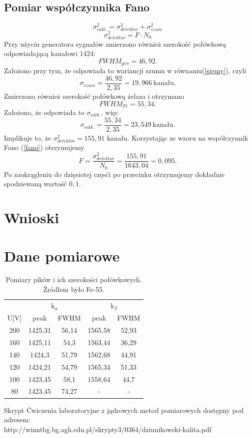 \documentclass[11pt,a4paper]{article}
\begin{document}
\subsection{Pomiar współczynnika Fano}
\begin{equation}
	\sigma_{całk.}^2 = \sigma_{detektor}^2 + \sigma_{szum}^2
	\label{sigmy}
\end{equation}
\begin{equation}
	\sigma_{detektor}^2 = F\cdot N_0
	\label{fano}
\end{equation}
Przy użyciu generatora sygnałów zmierzono również szerokość połówkową odpowiadającą kanałowi 1424:
$$FWHM_{gen} = 46,92.$$
Założono przy tym, że odpowiada to wariancji szumu w równaniu(\ref{sigmy}), czyli
$$\sigma_{szum} = \frac{46,92}{2,35} = 19,966~ \text{kanału}. $$
Zmierzono również szerokość połówkową żelaza i otrzymano
$$FWHM_{Fe} = 55,34.$$
Założono, że odpowiada to $\sigma_{całk.}$, więc
$$\sigma_{całk.} = \frac{55,34}{2,35} = 23,549~ \text{kanału}.$$
Implikuje to, że $\sigma_{detektor}^2 = 155,91$ kanału.
Korzystając ze wzoru na współczynnik Fano (\ref{fano}) otrzymujemy
$$ F = \frac{\sigma_{detektor}^2}{N_0} = \frac{155,91}{1643,04} = 0,095.$$
Po zaokrągleniu do dzięsiotej częsći po przecinku otrzymujemy dokładnie spodziewaną wartość $0,1$.
\section{Wnioski}

\section{Dane pomiarowe}

\begin{longtable}{c|cc|cc}
	\caption{Pomiary pików i ich szerokości połówkowych. Źródłem było Fe-55.}\\
\label{dt2}
 &\multicolumn{2}{c|}{k$_{\alpha}$}	&\multicolumn{2}{c}{k$_{\beta}$} \\
U[V]	&peak	&FWHM	&peak	&FWHM\\ \hline
\endhead
200	&1425,31	&56,14	&1565,58	&52,93 \\
160	&1425,11	&54,3	&1563,44	&36,29 \\
140	&1424,3		&51,79	&1562,68	&44,91 \\
120	&1424,21	&54,79	&1565,34	&51,33 \\
100	&1423,45	&58,1	&1558,64	&44,7 \\
80	&1423,45	&74,27	&-	&- \\
\end{longtable}

\begin{thebibliography}{9}
Skrypt Ćwiczenia laboratoryjne z jądrowych metod pomiarowych dostępny pod adresem:\\http://winntbg.bg.agh.edu.pl/skrypty3/0364/dziunikowski-kalita.pdf 
\end{thebibliography}
\end{document}
